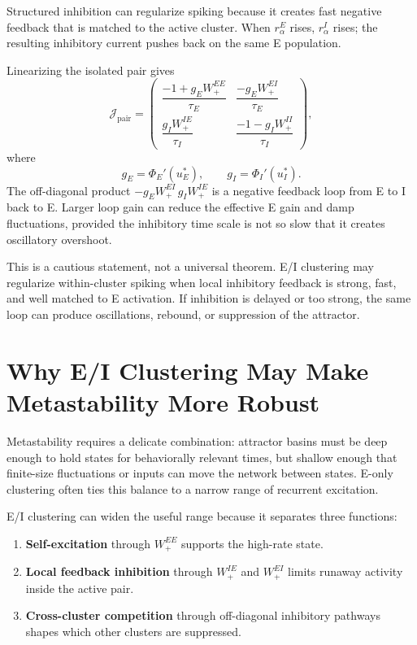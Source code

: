 Structured inhibition can regularize spiking because it creates fast negative feedback that is matched to the active cluster. When $r_{\alpha}^{E}$ rises, $r_{\alpha}^{I}$ rises; the resulting inhibitory current pushes back on the same E population.

Linearizing the isolated pair gives
%
\begin{equation}
  \mathcal{J}_{\mathrm{pair}}
  =
  \begin{pmatrix}
    \dfrac{-1+g_E W_{+}^{EE}}{\tau_E} &
    \dfrac{-g_E W_{+}^{EI}}{\tau_E} \\[1.0em]
    \dfrac{g_I W_{+}^{IE}}{\tau_I} &
    \dfrac{-1-g_I W_{+}^{II}}{\tau_I}
  \end{pmatrix},
  \label{eq:pair-jacobian}
\end{equation}
%
where
%
\begin{equation}
  g_E=\Phi_E'(u_E^*),
  \qquad
  g_I=\Phi_I'(u_I^*).
  \label{eq:pair-gains}
\end{equation}
%
The off-diagonal product $-g_E W_{+}^{EI}\,g_I W_{+}^{IE}$ is a negative feedback loop from E to I back to E. Larger loop gain can reduce the effective E gain and damp fluctuations, provided the inhibitory time scale is not so slow that it creates oscillatory overshoot.

This is a cautious statement, not a universal theorem. E/I clustering may regularize within-cluster spiking when local inhibitory feedback is strong, fast, and well matched to E activation. If inhibition is delayed or too strong, the same loop can produce oscillations, rebound, or suppression of the attractor.

\section{Why E/I Clustering May Make Metastability More Robust}
\label{sec:ei-clustering-robust-metastability}

Metastability requires a delicate combination: attractor basins must be deep enough to hold states for behaviorally relevant times, but shallow enough that finite-size fluctuations or inputs can move the network between states. E-only clustering often ties this balance to a narrow range of recurrent excitation.

E/I clustering can widen the useful range because it separates three functions:
%
\begin{enumerate}[leftmargin=*]
  \item \textbf{Self-excitation} through $W_{+}^{EE}$ supports the high-rate state.
  \item \textbf{Local feedback inhibition} through $W_{+}^{IE}$ and $W_{+}^{EI}$ limits runaway activity inside the active pair.
  \item \textbf{Cross-cluster competition} through off-diagonal inhibitory pathways shapes which other clusters are suppressed.
\end{enumerate}

